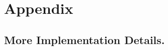 \newpage
\newpage
\appendix
\onecolumn

\section{Appendix}

\subsection{More Implementation Details.}




